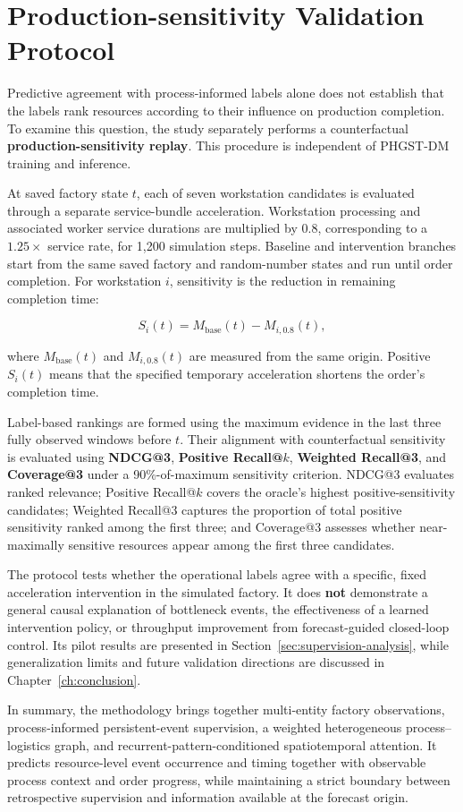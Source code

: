 \section{Production-sensitivity Validation Protocol}\label{production-sensitivity-validation-protocol}

Predictive agreement with process-informed labels alone does not establish that the labels rank resources according to their influence on production completion. To examine this question, the study separately performs a counterfactual \textbf{production-sensitivity replay}. This procedure is independent of PHGST-DM training and inference.

At saved factory state \(t\), each of seven workstation candidates is evaluated through a separate service-bundle acceleration. Workstation processing and associated worker service durations are multiplied by \(0.8\), corresponding to a \(1.25\times\) service rate, for 1,200 simulation steps. Baseline and intervention branches start from the same saved factory and random-number states and run until order completion. For workstation \(i\), sensitivity is the reduction in remaining completion time:

\[
S_i(t)=M_{\mathrm{base}}(t)-M_{i,0.8}(t),
\]

where \(M_{\mathrm{base}}(t)\) and \(M_{i,0.8}(t)\) are measured from the same origin. Positive \(S_i(t)\) means that the specified temporary acceleration shortens the order's completion time.

Label-based rankings are formed using the maximum evidence in the last three fully observed windows before \(t\). Their alignment with counterfactual sensitivity is evaluated using \textbf{NDCG@3}, \textbf{Positive Recall@\(k\)}, \textbf{Weighted Recall@3}, and \textbf{Coverage@3} under a 90\%-of-maximum sensitivity criterion. NDCG@3 evaluates ranked relevance; Positive Recall@\(k\) covers the oracle's highest positive-sensitivity candidates; Weighted Recall@3 captures the proportion of total positive sensitivity ranked among the first three; and Coverage@3 assesses whether near-maximally sensitive resources appear among the first three candidates.

The protocol tests whether the operational labels agree with a specific, fixed acceleration intervention in the simulated factory. It does \textbf{not} demonstrate a general causal explanation of bottleneck events, the effectiveness of a learned intervention policy, or throughput improvement from forecast-guided closed-loop control. Its pilot results are presented in Section~\ref{sec:supervision-analysis}, while generalization limits and future validation directions are discussed in Chapter~\ref{ch:conclusion}.

In summary, the methodology brings together multi-entity factory observations, process-informed persistent-event supervision, a weighted heterogeneous process--logistics graph, and recurrent-pattern-conditioned spatiotemporal attention. It predicts resource-level event occurrence and timing together with observable process context and order progress, while maintaining a strict boundary between retrospective supervision and information available at the forecast origin.

